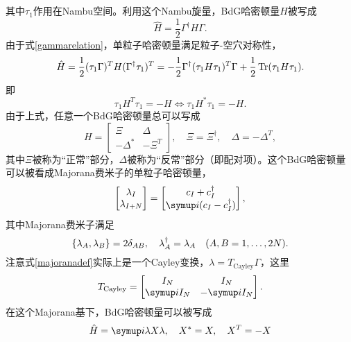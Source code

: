 其中$\tau_1$作用在Nambu空间。利用这个Nambu旋量，BdG哈密顿量$\hat H$被写成
\begin{equation}
  \hat H = \frac{1}{2}\Gamma^\dagger H \Gamma.
\end{equation}
由于式\eqref{gammarelation}，单粒子哈密顿量满足粒子-空穴对称性，
\begin{equation}
  \hat H = \frac{1}{2}(\tau_1\Gamma)^T H (\Gamma^\dagger \tau_1)^T = -\frac{1}{2}\Gamma^\dagger(\tau_1 H\tau_1)^T \Gamma + \frac{1}{2}\Tr(\tau_1 H\tau_1).
\end{equation}
即
\begin{equation}
  \tau_1 H^T \tau_1 = -H \Leftrightarrow \tau_1 H^* \tau_1 = -H.
\end{equation}
由于上式，任意一个BdG哈密顿量总可以写成
\begin{equation}
  H= \begin{bmatrix}
      \Xi & \Delta\\
      -\Delta^* & -\Xi^T
  \end{bmatrix},\quad \Xi = \Xi^\dagger ,\quad \Delta =- \Delta^T,
\end{equation}
其中$\Xi$被称为“正常”部分，$\Delta$被称为“反常”部分（即配对项）。这个BdG哈密顿量可以被看成Majorana费米子的单粒子哈密顿量，
\begin{equation}
  \begin{bmatrix}
      \lambda_I\\
      \lambda_{I+N}
  \end{bmatrix}=\begin{bmatrix}
      c_I + c_I^\dagger \\
      \iu (c_I - c_I^\dagger)
  \end{bmatrix},\label{majoranadef}
\end{equation}
其中Majorana费米子满足
\begin{equation}
  \Bqty{\lambda_A,\lambda_B} = 2\delta_{AB},\quad \lambda_A^\dagger = \lambda_A\quad (A,B=1,\dots,2N).
\end{equation}
注意式\eqref{majoranadef}实际上是一个Cayley变换，$\lambda = T_{\text{Cayley}} \Gamma$，这里
\begin{equation}
  T_{\text{Cayley}} = \begin{bmatrix}
      I_N & I_N\\
      \iu I_N & -\iu I_N
  \end{bmatrix}.
\end{equation}
在这个Majorana基下，BdG哈密顿量可以被写成
\begin{equation}
  \hat H = \iu \lambda X \lambda,\quad X^* = X,\quad X^T = -X
\end{equation}
